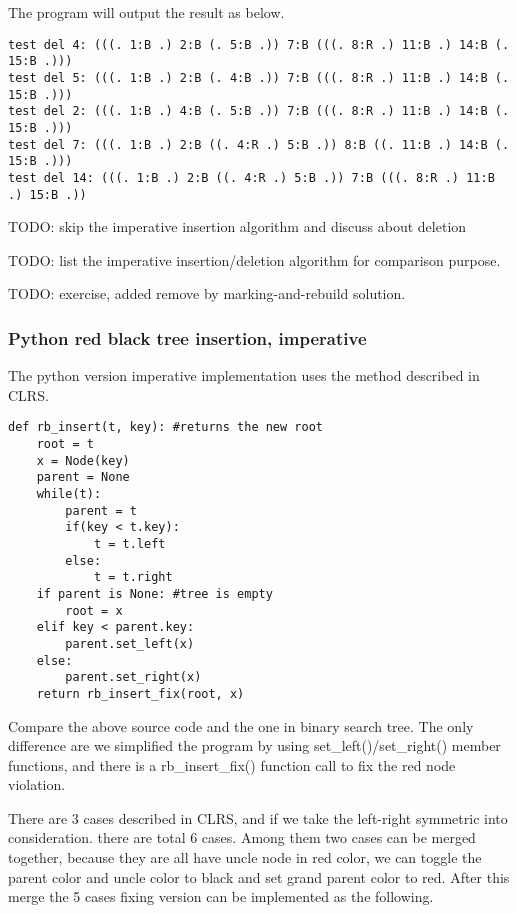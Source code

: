 \documentclass{article}
\begin{document}
The program will output the result as below.

\begin{verbatim}
test del 4: (((. 1:B .) 2:B (. 5:B .)) 7:B (((. 8:R .) 11:B .) 14:B (. 15:B .)))
test del 5: (((. 1:B .) 2:B (. 4:B .)) 7:B (((. 8:R .) 11:B .) 14:B (. 15:B .)))
test del 2: (((. 1:B .) 4:B (. 5:B .)) 7:B (((. 8:R .) 11:B .) 14:B (. 15:B .)))
test del 7: (((. 1:B .) 2:B ((. 4:R .) 5:B .)) 8:B ((. 11:B .) 14:B (. 15:B .)))
test del 14: (((. 1:B .) 2:B ((. 4:R .) 5:B .)) 7:B (((. 8:R .) 11:B .) 15:B .))
\end{verbatim}

TODO: skip the imperative insertion algorithm and discuss about deletion

TODO: list the imperative insertion/deletion algorithm for comparison purpose.

TODO: exercise, added remove by marking-and-rebuild solution.

\subsubsection*{Python red black tree insertion, imperative}

The python version imperative implementation uses the method described in CLRS.

\lstset{language=Python}
\begin{lstlisting}
def rb_insert(t, key): #returns the new root
    root = t
    x = Node(key)
    parent = None
    while(t):
        parent = t
        if(key < t.key):
            t = t.left
        else:
            t = t.right
    if parent is None: #tree is empty
        root = x
    elif key < parent.key:
        parent.set_left(x)
    else:
        parent.set_right(x)
    return rb_insert_fix(root, x)
\end{lstlisting}

Compare the above source code and the one in binary search tree\cite{bst-lxy}. The only difference are we simplified the program by using set\_left()/set\_right() member functions, and there is a rb\_insert\_fix() function call to fix the red node violation.

There are 3 cases described in CLRS, and if we take the left-right symmetric into consideration. there are total 6 cases. Among them two cases can be merged together, because they are all have uncle node in red color, we can toggle the parent color and uncle color to black and set grand parent color to red. After this merge the 5 cases fixing version can be implemented as the following.
\end{document}
